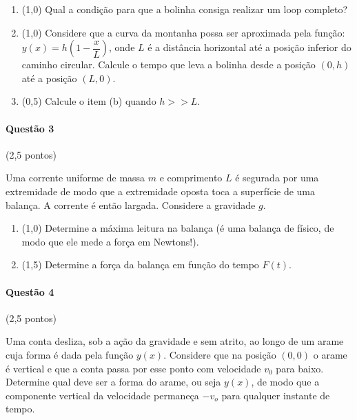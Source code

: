 \documentclass[12pt,a4paper]{article}
\begin{document}
\begin{enumerate}[label=(\alph*)]

\item (1,0) Qual a condição para que a bolinha consiga realizar um loop completo?

\item (1,0) Considere que a curva da montanha possa ser aproximada pela função: $y(x)=h\left(1-\dfrac x L\right)$, onde $L$ é a distância horizontal até a posição inferior do caminho circular. Calcule o tempo que leva a bolinha desde a posição $(0,h)$ até a posição $(L,0)$.

\item (0,5) Calcule o item (b) quando $h>>L$.

\end{enumerate}

\paragraph{Questão 3} (2,5 pontos)

Uma corrente uniforme de massa $m$ e comprimento $L$ é segurada por uma extremidade de modo que a extremidade oposta toca a superfície de uma balança. A corrente é então largada. Considere a gravidade $g$.

\begin{enumerate}[label=(\alph*)]

\item (1,0) Determine a máxima leitura na balança (é uma balança de físico, de modo que ele mede a força em Newtons!).

\item (1,5) Determine a força da balança em função do tempo $F(t)$.

\end{enumerate}

\paragraph{Questão 4} (2,5 pontos)

Uma conta desliza, sob a ação da gravidade e sem atrito, ao longo de um arame cuja forma é dada pela função $y(x)$. Considere que na posição $(0,0)$ o arame é vertical e que a conta passa por esse ponto com velocidade $v_0$ para baixo. Determine qual deve ser a forma do arame, ou seja $y(x)$, de modo que a componente vertical da velocidade permaneça $-v_o$ para qualquer instante de tempo.

\newpage
\end{document}
